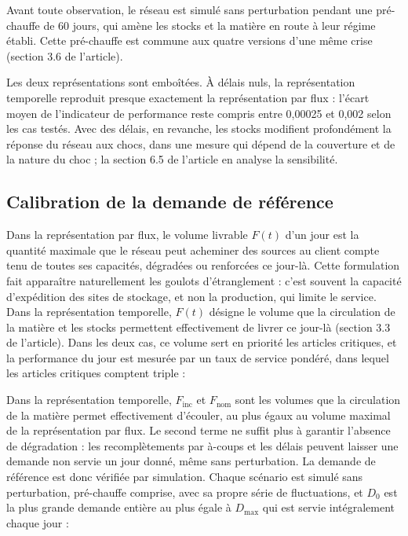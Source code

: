 Avant toute observation, le réseau est simulé sans perturbation pendant une pré-chauffe de 60 jours, qui amène les stocks et la matière en route à leur régime établi. Cette pré-chauffe est commune aux quatre versions d'une même crise (section 3.6 de l'article).

Les deux représentations sont emboîtées. À délais nuls, la représentation temporelle reproduit presque exactement la représentation par flux : l'écart moyen de l'indicateur de performance reste compris entre 0,00025 et 0,002 selon les cas testés. Avec des délais, en revanche, les stocks modifient profondément la réponse du réseau aux chocs, dans une mesure qui dépend de la couverture et de la nature du choc ; la section 6.5 de l'article en analyse la sensibilité.

\subsection*{Calibration de la demande de référence}

Dans la représentation par flux, le volume livrable $F(t)$ d'un jour est la quantité maximale que le réseau peut acheminer des sources au client compte tenu de toutes ses capacités, dégradées ou renforcées ce jour-là. Cette formulation fait apparaître naturellement les goulots d'étranglement : c'est souvent la capacité d'expédition des sites de stockage, et non la production, qui limite le service. Dans la représentation temporelle, $F(t)$ désigne le volume que la circulation de la matière et les stocks permettent effectivement de livrer ce jour-là (section 3.3 de l'article). Dans les deux cas, ce volume sert en priorité les articles critiques, et la performance du jour est mesurée par un taux de service pondéré, dans lequel les articles critiques comptent triple :

Dans la représentation temporelle, $F_{\mathrm{inc}}$ et $F_{\mathrm{nom}}$ sont les volumes que la circulation de la matière permet effectivement d'écouler, au plus égaux au volume maximal de la représentation par flux. Le second terme ne suffit plus à garantir l'absence de dégradation : les recomplètements par à-coups et les délais peuvent laisser une demande non servie un jour donné, même sans perturbation. La demande de référence est donc vérifiée par simulation. Chaque scénario est simulé sans perturbation, pré-chauffe comprise, avec sa propre série de fluctuations, et $D_{0}$ est la plus grande demande entière au plus égale à $D_{\mathrm{max}}$ qui est servie intégralement chaque jour :

